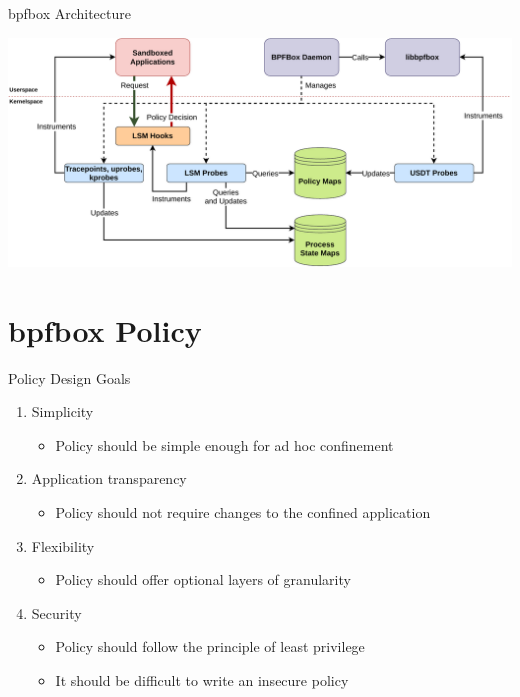 \documentclass[12pt, dvipsnames]{beamer}
\begin{document}
\begin{frame}[c]{bpfbox Architecture}
\begin{center}
    \color{black}
    \includegraphics[width=1\textwidth]{figs/bpfbox-overview.pdf}
\end{center}
\end{frame}

\section{bpfbox Policy}

\begin{frame}[c]{Policy Design Goals}
\begin{enumerate}
    \item Simplicity
    \begin{itemize}
        \item Policy should be simple enough for ad hoc confinement
    \end{itemize}
    \vfill
    \item Application transparency
    \begin{itemize}
        \item Policy should not require changes to the confined application
    \end{itemize}
    \vfill
    \item Flexibility
    \begin{itemize}
        \item Policy should offer optional layers of granularity
    \end{itemize}
    \vfill
    \item Security
    \begin{itemize}
        \item Policy should follow the principle of least privilege
        \item It should be difficult to write an insecure policy
    \end{itemize}
\end{enumerate}
\end{frame}
\end{document}

